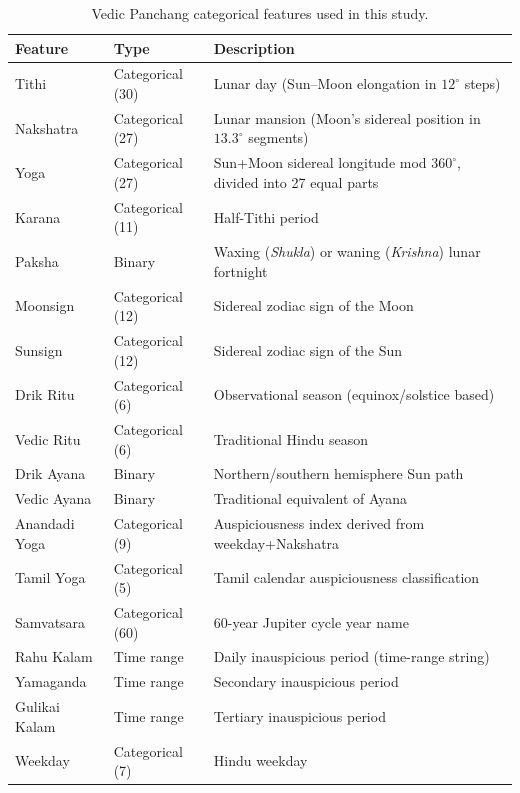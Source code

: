 \documentclass[12pt,a4paper]{article}
\begin{document}
\begin{table}[H]
  \centering
  \caption{Vedic Panchang categorical features used in this study.}
  \label{tab:panchang_features}
  \small
  \begin{tabular}{llp{7cm}}
    \toprule
    \textbf{Feature} & \textbf{Type} & \textbf{Description} \\
    \midrule
    Tithi       & Categorical (30)  & Lunar day (Sun--Moon elongation in $12^\circ$ steps) \\
    Nakshatra   & Categorical (27)  & Lunar mansion (Moon's sidereal position in $13.3^\circ$ segments) \\
    Yoga        & Categorical (27)  & Sun+Moon sidereal longitude mod $360^\circ$, divided into 27 equal parts \\
    Karana      & Categorical (11)  & Half-Tithi period \\
    Paksha      & Binary            & Waxing (\textit{Shukla}) or waning (\textit{Krishna}) lunar fortnight \\
    Moonsign    & Categorical (12)  & Sidereal zodiac sign of the Moon \\
    Sunsign     & Categorical (12)  & Sidereal zodiac sign of the Sun \\
    Drik Ritu   & Categorical (6)   & Observational season (equinox/solstice based) \\
    Vedic Ritu  & Categorical (6)   & Traditional Hindu season \\
    Drik Ayana  & Binary            & Northern/southern hemisphere Sun path \\
    Vedic Ayana & Binary            & Traditional equivalent of Ayana \\
    Anandadi Yoga & Categorical (9) & Auspiciousness index derived from weekday+Nakshatra \\
    Tamil Yoga  & Categorical (5)   & Tamil calendar auspiciousness classification \\
    Samvatsara  & Categorical (60)  & 60-year Jupiter cycle year name \\
    Rahu Kalam  & Time range        & Daily inauspicious period (time-range string) \\
    Yamaganda   & Time range        & Secondary inauspicious period \\
    Gulikai Kalam & Time range      & Tertiary inauspicious period \\
    Weekday     & Categorical (7)   & Hindu weekday \\
    \bottomrule
  \end{tabular}
\end{table}
\end{document}
